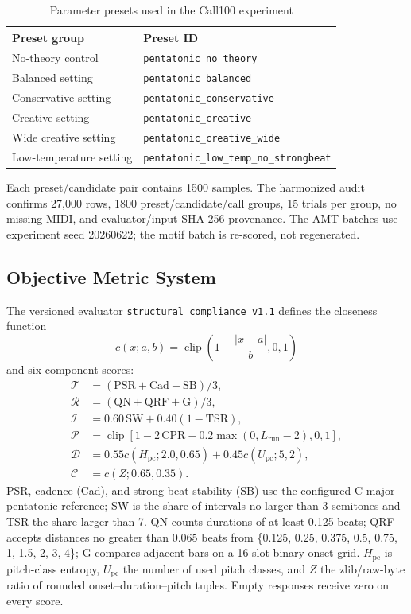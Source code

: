 \documentclass[11pt,a4paper]{article}
\begin{document}
\begin{table}[htbp]
\centering
\caption{Parameter presets used in the Call100 experiment}
\label{tab:parameter-presets}
\small
\begin{tabular}{ll}
\toprule
Preset group & Preset ID \\
\midrule
No-theory control & \texttt{pentatonic\_no\_theory} \\
Balanced setting & \texttt{pentatonic\_balanced} \\
Conservative setting & \texttt{pentatonic\_conservative} \\
Creative setting & \texttt{pentatonic\_creative} \\
Wide creative setting & \texttt{pentatonic\_creative\_wide} \\
Low-temperature setting & \texttt{pentatonic\_low\_temp\_no\_strongbeat} \\
\bottomrule
\end{tabular}
\end{table}

Each preset/candidate pair contains 1500 samples. The harmonized audit confirms 27,000 rows, 1800 preset/candidate/call groups, 15 trials per group, no missing MIDI, and evaluator/input SHA-256 provenance. The AMT batches use experiment seed 20260622; the motif batch is re-scored, not regenerated.

\subsection{Objective Metric System}
\label{subsec:metrics}

The versioned evaluator \texttt{structural\_compliance\_v1.1} defines the closeness function
\begin{equation}
c(x;a,b)=\operatorname{clip}\left(1-\frac{|x-a|}{b},0,1\right)
\end{equation}
and six component scores:
\begin{align}
\mathcal T &= (\mathrm{PSR}+\mathrm{Cad}+\mathrm{SB})/3,\\
\mathcal R &= (\mathrm{QN}+\mathrm{QRF}+\mathrm{G})/3,\\
\mathcal I &=0.60\,\mathrm{SW}+0.40(1-\mathrm{TSR}),\\
\mathcal P &=\operatorname{clip}[1-2\,\mathrm{CPR}-0.2\max(0,L_{\mathrm{run}}-2),0,1],\\
\mathcal D &=0.55c(H_{\mathrm{pc}};2.0,0.65)+0.45c(U_{\mathrm{pc}};5,2),\\
\mathcal C &=c(Z;0.65,0.35).
\end{align}
PSR, cadence (Cad), and strong-beat stability (SB) use the configured C-major-pentatonic reference; SW is the share of intervals no larger than 3 semitones and TSR the share larger than 7. QN counts durations of at least 0.125 beats; QRF accepts distances no greater than 0.065 beats from \{0.125, 0.25, 0.375, 0.5, 0.75, 1, 1.5, 2, 3, 4\}; G compares adjacent bars on a 16-slot binary onset grid. $H_{\mathrm{pc}}$ is pitch-class entropy, $U_{\mathrm{pc}}$ the number of used pitch classes, and $Z$ the zlib/raw-byte ratio of rounded onset--duration--pitch tuples. Empty responses receive zero on every score.
\end{document}
